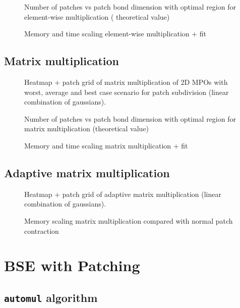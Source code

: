 \begin{figure}[ht!]
    \caption{Number of patches vs patch bond dimension with optimal region for element-wise multiplication ( theoretical value) }
\end{figure}

\begin{figure}[ht!]
    \caption{Memory and time scaling element-wise multiplication + fit  }
\end{figure}

\subsection{Matrix multiplication}
\begin{figure}[ht!]
    \caption{Heatmap + patch grid of matrix multiplication of 2D MPOs with worst, average and best case scenario for patch subdivision (linear combination of gaussians). }
\end{figure}

\begin{figure}[ht!]
    \caption{Number of patches vs patch bond dimension with optimal region for matrix multiplication (theoretical value) }
\end{figure}

\begin{figure}[ht!]
    \caption{Memory and time scaling matrix multiplication + fit  }
\end{figure}

\subsection{Adaptive matrix multiplication}


\begin{figure}[ht!]
    \caption{Heatmap + patch grid of adaptive matrix multiplication (linear combination of gaussians). }
\end{figure}

\begin{figure}[ht!]
    \caption{Memory scaling matrix multiplication compared with normal patch contraction }
\end{figure}


\section{BSE with Patching}

\subsection{\texttt{automul} algorithm}

